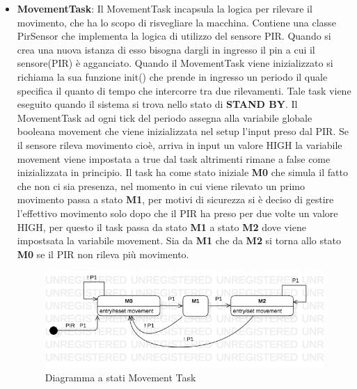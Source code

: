 \documentclass[a4paper]{article}
\begin{document}
\begin{itemize}

\item \textbf{MovementTask}:
Il MovementTask incapsula la logica per rilevare il movimento, che ha lo scopo di risvegliare la macchina. Contiene una classe PirSensor che implementa la logica di utilizzo del sensore PIR. Quando si crea una nuova istanza di esso bisogna dargli in ingresso il pin a cui il sensore(PIR) è agganciato. 
Quando il MovementTask viene inizializzato si richiama la sua funzione init() che prende in ingresso un periodo il quale specifica il quanto di tempo che intercorre tra due rilevamenti. 
Tale task viene eseguito quando il sistema si trova nello stato di \textbf{STAND BY}. Il MovementTask ad ogni tick del periodo assegna alla
variabile globale booleana movement che viene inizializzata nel setup l'input preso dal PIR. Se il sensore rileva movimento cioè, arriva in input un valore HIGH la variabile movement viene impostata a true dal task altrimenti rimane a false come inizializzata in principio.  
Il task ha come stato iniziale \textbf{M0} che simula il fatto che non ci sia presenza, nel momento in cui viene rilevato un primo movimento passa a stato \textbf{M1}, per motivi di sicurezza si è deciso di gestire l'effettivo movimento solo dopo che il PIR ha preso per due volte un valore HIGH, per questo il task passa da stato \textbf{M1} a stato \textbf{M2} dove viene impostsata la variabile movement. Sia da  \textbf{M1} che da \textbf{M2} si torna allo stato \textbf{M0} se il PIR non rileva più movimento. 

\begin{figure}[h!]
	\includegraphics[scale = 0.60]{MovementTask.png}
	\caption{Diagramma a stati Movement Task}
\end{figure}

\newpage


\end{itemize}
\end{document}
